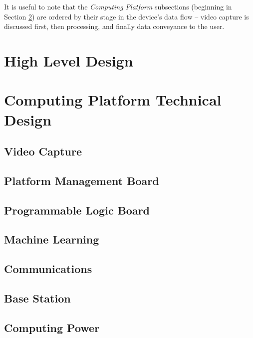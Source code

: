 \documentclass[10pt,letterpaper]{article}
\begin{document}
It is useful to note that the \textit{Computing Platform} subsections (beginning in Section \ref{computing_platform}) are ordered by their stage in the device's data flow -- video capture is discussed first, then processing, and finally data conveyance to the user.

\newpage
\section{High Level Design}\label{high_level_design}


\section{Computing Platform Technical Design}\label{computing_platform}

\subsection{Video Capture}\label{video_capture}


\subsection{Platform Management Board}\label{platform_management}


\subsection{Programmable Logic Board}\label{programmable_logic}


\subsection{Machine Learning}\label{machine_learning}


\subsection{Communications}\label{communications}


\subsection{Base Station}\label{base_station}


\subsection{Computing Power}\label{computing_power}

\end{document}
